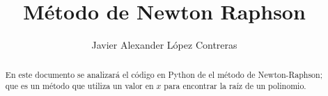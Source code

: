 \documentclass{rmf-d}
\begin{document}




\title{Método de Newton Raphson
\vspace{-6pt}}
\author{Javier Alexander López Contreras }

\address{Facultad de Ciencias Físico Matemáticas (FCFM), Universidad Autónoma de Coahuila, Campus Campo redondo }
\\

\maketitle




\begin{center}
\recibido{
\vspace{-10pt}}
\end{center}


\begin{abstract}
En este documento se analizará el código en Python de el método de Newton-Raphson; que es un método que utiliza un valor en $x$ para encontrar la raíz de un polinomio.
\end{abstract}
\end{document}
